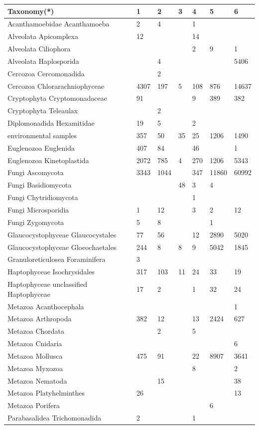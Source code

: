 \documentclass[a4paper]{article}
\begin{document}
\begin{tabular}{lllllll}
\hline
Taxonomy(*) &1&2&3&4&5&6\\
\hline
Acanthamoebidae Acanthamoeba&2&4& &1& &\\
Alveolata Apicomplexa&12&&&14& &\\
Alveolata Ciliophora&&&&2&9&1\\
Alveolata Haplosporida&&4&&&&5406\\
Cercozoa Cercomonadida&&2&&&&\\
Cercozoa Chlorarachniophyceae&4307&197&5&108&876&14637\\
Cryptophyta Cryptomonadaceae&91&&&9&389&382\\
Cryptophyta Teleaulax&&2&&&&\\
Diplomonadida Hexamitidae&19&5&&2&&\\
environmental samples&357&50&35&25&1206&1490\\
Euglenozoa Euglenida&407&84&&46&&1\\
Euglenozoa Kinetoplastida&2072&785&4&270&1206&5343\\
Fungi Ascomycota&3343&1044&&347&11860&60992\\
Fungi Basidiomycota&&&48&3&4&\\
Fungi Chytridiomycota&&&&1&&\\
Fungi Microsporidia&1&12&&3&2&12\\
Fungi Zygomycota&5&8&&&1&\\
Glaucocystophyceae Glaucocystales&77&56&&12&2890&5020\\
Glaucocystophyceae Gloeochaetales&244&8&8&9&5042&1845\\
Granuloreticulosea Foraminifera&3&&&&&\\
Haptophyceae Isochrysidales&317&103&11&24&33&19\\
Haptophyceae unclassified Haptophyceae&17&2&&1&32&24\\
Metazoa Acanthocephala&&&&&&1\\
Metazoa Arthropoda&382&12&&13&2424&627\\
Metazoa Chordata&&2&&5&&\\
Metazoa Cnidaria&&&&&&6\\
Metazoa Mollusca&475&91&&22&8907&3641\\
Metazoa Myxozoa&&&&8&&2\\
Metazoa Nematoda&&15&&&&38\\
Metazoa Platyhelminthes&26&&&&&13\\
Metazoa Porifera&&&&&6&\\
Parabasalidea Trichomonadida&2&&&1&&\\

\end{tabular}
\end{document}
